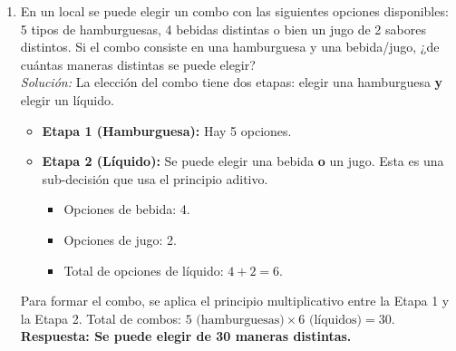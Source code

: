 \documentclass[12pt, letterpaper]{article}
\begin{document}
\begin{enumerate}
    \item En un local se puede elegir un combo con las siguientes opciones disponibles: 5 tipos de hamburguesas, 4 bebidas distintas o bien un jugo de 2 sabores distintos. Si el combo consiste en una hamburguesa y una bebida/jugo, ¿de cuántas maneras distintas se puede elegir? \\
    \textit{Solución:}
    La elección del combo tiene dos etapas: elegir una hamburguesa \textbf{y} elegir un líquido.
    \begin{itemize}
        \item \textbf{Etapa 1 (Hamburguesa):} Hay 5 opciones.
        \item \textbf{Etapa 2 (Líquido):} Se puede elegir una bebida \textbf{o} un jugo. Esta es una sub-decisión que usa el principio aditivo.
        \begin{itemize}
            \item Opciones de bebida: 4.
            \item Opciones de jugo: 2.
            \item Total de opciones de líquido: $4 + 2 = 6$.
        \end{itemize}
    \end{itemize}
    Para formar el combo, se aplica el principio multiplicativo entre la Etapa 1 y la Etapa 2.
    Total de combos: $5 \text{ (hamburguesas)} \times 6 \text{ (líquidos)} = 30$. \\
    \textbf{Respuesta: Se puede elegir de 30 maneras distintas.}
\end{enumerate}
\end{document}
